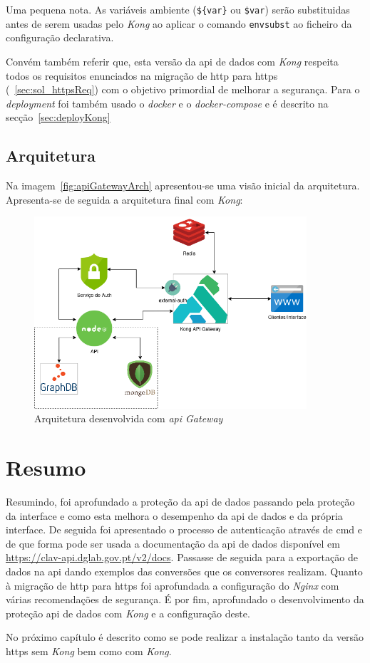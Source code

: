 Uma pequena nota. As variáveis ambiente (\verb|${var}| ou \verb|$var|) serão substituidas antes de serem usadas pelo \textit{Kong} ao aplicar o comando \texttt{envsubst} ao ficheiro da configuração declarativa.

Convém também referir que, esta versão da \acrshort{api} de dados com \textit{Kong} respeita todos os requisitos enunciados na migração de \acrshort{http} para \acrshort{https} (~\ref{sec:sol_httpsReq}) com o objetivo primordial de melhorar a segurança. Para o \textit{deployment} foi também usado o \textit{docker} e o \textit{docker-compose} e é descrito na secção~\ref{sec:deployKong}

\subsection{Arquitetura}
Na imagem~\ref{fig:apiGatewayArch} apresentou-se uma visão inicial da arquitetura. Apresenta-se de seguida a arquitetura final com \textit{Kong}: 
\begin{figure}[H]
    \begin{center}
        \includegraphics[width=0.9\textwidth]{img/apiGatewayArchFinal.png}
    \end{center}
    \caption{Arquitetura desenvolvida com \textit{\acrshort{api} Gateway}}\label{fig:apiGatewayArchFinal}
\end{figure}

\section{Resumo}

Resumindo, foi aprofundado a proteção da \acrshort{api} de dados passando pela proteção da interface e como esta melhora o desempenho da \acrshort{api} de dados e da própria interface. De seguida foi apresentado o processo de autenticação através de \acrlong{cmd} e de que forma pode ser usada a documentação da \acrshort{api} de dados disponível em \url{https://clav-api.dglab.gov.pt/v2/docs}. Passasse de seguida para a exportação de dados na \acrshort{api} dando exemplos das conversões que os conversores realizam. Quanto à migração de \acrshort{http} para \acrshort{https} foi aprofundada a configuração do \textit{Nginx} com várias recomendações de segurança. É por fim, aprofundado o desenvolvimento da proteção \acrshort{api} de dados com \textit{Kong} e a configuração deste.

No próximo capítulo é descrito como se pode realizar a instalação tanto da versão \acrshort{https} sem \textit{Kong} bem como com \textit{Kong}.
